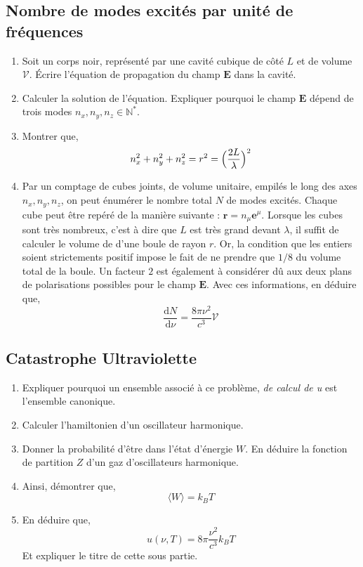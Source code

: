 \documentclass[a4paper,10pt]{report}
\begin{document}
\subsection{Nombre de modes excités par unité de fréquences}
	\begin{enumerate}
		\item Soit un corps noir, représenté par une cavité cubique de côté $L$ et de volume $\mathcal{V}$. Écrire l'équation de propagation du champ $\textbf{E}$ dans la cavité.
		\item Calculer la solution de l'équation. Expliquer pourquoi le champ $\textbf{E}$ dépend de trois modes $n_x, n_y, n_z \in \mathbb{N}^*$.
		\item Montrer que,
		$$n_x^2+n_y^2+n_z^2 = r^2 = \Bigl(\frac {2L}\lambda\Bigr)^2$$
		\item Par un comptage de cubes joints, de volume unitaire, empilés le long des axes  $n_x, n_y, n_z$, on peut énumérer le nombre total $N$ de modes excités.
		Chaque cube peut être repéré de la manière suivante : $\textbf{r} = n_\mu \textbf{e}^\mu$.
		Lorsque les cubes sont très nombreux, c'est à dire que $L$ est très grand devant $\lambda$, il suffit de calculer le volume de d'une boule de rayon $r$. Or, la condition que les entiers soient strictements positif impose le fait de ne prendre que $1/8$ du volume total de la boule. Un facteur $2$ est également à considérer dû aux deux plans de polarisations possibles pour le champ $\textbf{E}$.
		Avec ces informations, en déduire que,
		$$\frac {\text{d}N}{\text{d}\nu} = \frac {8\pi\nu^2}{c^3}\mathcal{V}$$
			\end{enumerate}
	\subsection{Catastrophe Ultraviolette}
	\begin{enumerate}
		\item Expliquer pourquoi un 
		ensemble associé à ce problème, \textit{de calcul de u} est l'ensemble canonique.
		\item Calculer l'hamiltonien d'un oscillateur harmonique. 
		\item Donner la probabilité d'être dans l'état d'énergie $W$. En déduire la fonction de partition $Z$ d'un gaz d'oscillateurs harmonique.
		\item Ainsi, démontrer que,
		$$\langle W \rangle = k_B T$$
		\item En déduire que,
		$$u(\nu,T) = 8\pi \frac{\nu^2}{c^3}k_BT$$
		Et expliquer le titre de cette sous partie.
	\end{enumerate}
\end{document}
